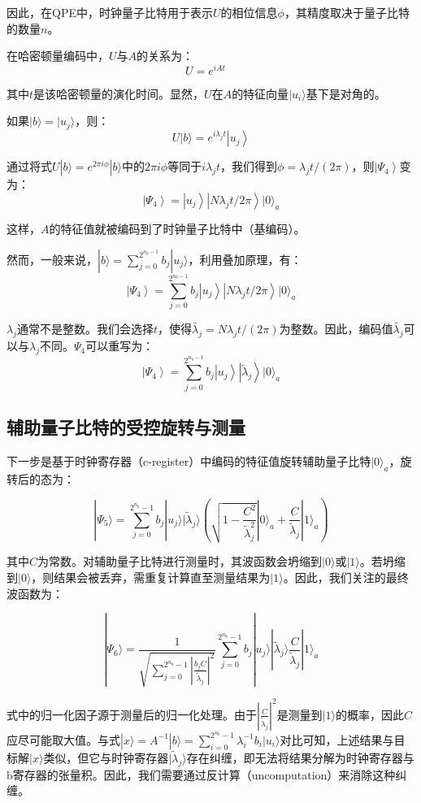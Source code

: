 \documentclass{article}
\begin{document}
因此，在QPE中，时钟量子比特用于表示$U$的相位信息$\phi$，其精度取决于量子比特的数量$n$。

在哈密顿量编码中，$U$与$A$的关系为：
\[
U=e^{i A t} \quad
\]

其中$t$是该哈密顿量的演化时间。显然，$U$在$A$的特征向量$|u_{i}\rangle$基下是对角的。

如果$|b\rangle = |u_{j}\rangle$，则：
\[
U|b\rangle=e^{i \lambda_{j} t}\left|u_{j}\right\rangle
\]

通过将式$U|b\rangle=e^{2 \pi i \phi}|b\rangle$中的$2\pi i\phi$等同于$i\lambda_{j}t$，我们得到$\phi=\lambda_{j}t/(2\pi)$，则$\left|\Psi_{4}\right>$变为：
\[
\left|\Psi_{4}\right>=\left|u_{j}\right\rangle\left|N \lambda_{j} t / 2 \pi\right\rangle|0\rangle_{a}
\]

这样，$A$的特征值就被编码到了时钟量子比特中（基编码）。

然而，一般来说，$|b\rangle=\sum_{j=0}^{2^{n_{b}-1}}b_{j}|u_{j}\rangle$，利用叠加原理，有：
\[
\left|\Psi_{4}\right>=\sum_{j=0}^{2^{n_{b}-1}} b_{j}\left|u_{j}\right\rangle\left|N \lambda_{j} t / 2 \pi\right\rangle|0\rangle_{a}
\]

$\lambda_{j}$通常不是整数。我们会选择$t$，使得$\tilde{\lambda_{j}}=N\lambda_{j}t/(2\pi)$为整数。因此，编码值$\tilde{\lambda_{j}}$可以与$\lambda_{j}$不同。$\Psi_{4}$可以重写为：
\[
\left|\Psi_{4}\right>=\sum_{j=0}^{2^{n_{b}-1}} b_{j}\left|u_{j}\right\rangle\left|\tilde{\lambda}_{j}\right\rangle|0\rangle_{a}
\]
\subsection{辅助量子比特的受控旋转与测量}

下一步是基于时钟寄存器（c-register）中编码的特征值旋转辅助量子比特\(|0\rangle_a\)，旋转后的态为：

\[
|\Psi_5\rangle = \sum_{j=0}^{2^{n_b}-1} b_j |u_j\rangle |\tilde{\lambda}_j\rangle \left( \sqrt{1 - \frac{C^2}{\tilde{\lambda}_j^2}} |0\rangle_a + \frac{C}{\tilde{\lambda}_j} |1\rangle_a \right)
\]

其中\(C\)为常数。对辅助量子比特进行测量时，其波函数会坍缩到\(|0\rangle\)或\(|1\rangle\)。若坍缩到\(|0\rangle\)，则结果会被丢弃，需重复计算直至测量结果为\(|1\rangle\)。因此，我们关注的最终波函数为：

\[
|\Psi_6\rangle = \frac{1}{\sqrt{\sum_{j=0}^{2^{n_b}-1} \left| \frac{b_j C}{\tilde{\lambda}_j} \right|^2}} \sum_{j=0}^{2^{n_b}-1} b_j |u_j\rangle |\tilde{\lambda}_j\rangle \frac{C}{\tilde{\lambda}_j} |1\rangle_a
\]

式中的归一化因子源于测量后的归一化处理。由于\(\left| \frac{C}{\tilde{\lambda}_j} \right|^2\)是测量到\(|1\rangle\)的概率，因此\(C\)应尽可能取大值。与式\(|x\rangle = A^{-1} |b\rangle = \sum_{i=0}^{2^{n_b}-1} \lambda_i^{-1} b_i |u_i\rangle\)对比可知，上述结果与目标解\(|x\rangle\)类似，但它与时钟寄存器\(|\tilde{\lambda}_j\rangle\)存在纠缠，即无法将结果分解为时钟寄存器与b寄存器的张量积。因此，我们需要通过反计算（uncomputation）来消除这种纠缠。
\end{document}
